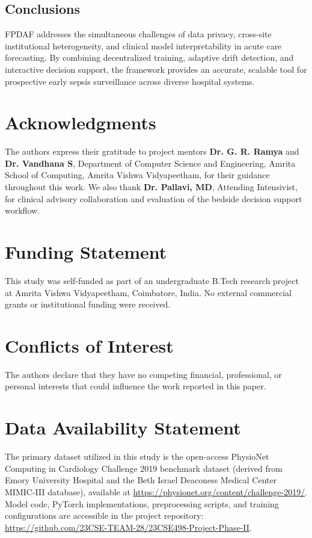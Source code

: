 \documentclass[11pt,a4paper]{article}
\begin{document}
\subsection{Conclusions}
FPDAF addresses the simultaneous challenges of data privacy, cross-site institutional heterogeneity, and clinical model interpretability in acute care forecasting. By combining decentralized training, adaptive drift detection, and interactive decision support, the framework provides an accurate, scalable tool for prospective early sepsis surveillance across diverse hospital systems.

\section*{Acknowledgments}
The authors express their gratitude to project mentors \textbf{Dr. G. R. Ramya} and \textbf{Dr. Vandhana S}, Department of Computer Science and Engineering, Amrita School of Computing, Amrita Vishwa Vidyapeetham, for their guidance throughout this work. We also thank \textbf{Dr. Pallavi, MD}, Attending Intensivist, for clinical advisory collaboration and evaluation of the bedside decision support workflow.

\section*{Funding Statement}
This study was self-funded as part of an undergraduate B.Tech research project at Amrita Vishwa Vidyapeetham, Coimbatore, India. No external commercial grants or institutional funding were received.

\section*{Conflicts of Interest}
The authors declare that they have no competing financial, professional, or personal interests that could influence the work reported in this paper.

\section*{Data Availability Statement}
The primary dataset utilized in this study is the open-access PhysioNet Computing in Cardiology Challenge 2019 benchmark dataset (derived from Emory University Hospital and the Beth Israel Deaconess Medical Center MIMIC-III database), available at \url{https://physionet.org/content/challenge-2019/}. Model code, PyTorch implementations, preprocessing scripts, and training configurations are accessible in the project repository: \url{https://github.com/23CSE-TEAM-28/23CSE498-Project-Phase-II}.
\end{document}
